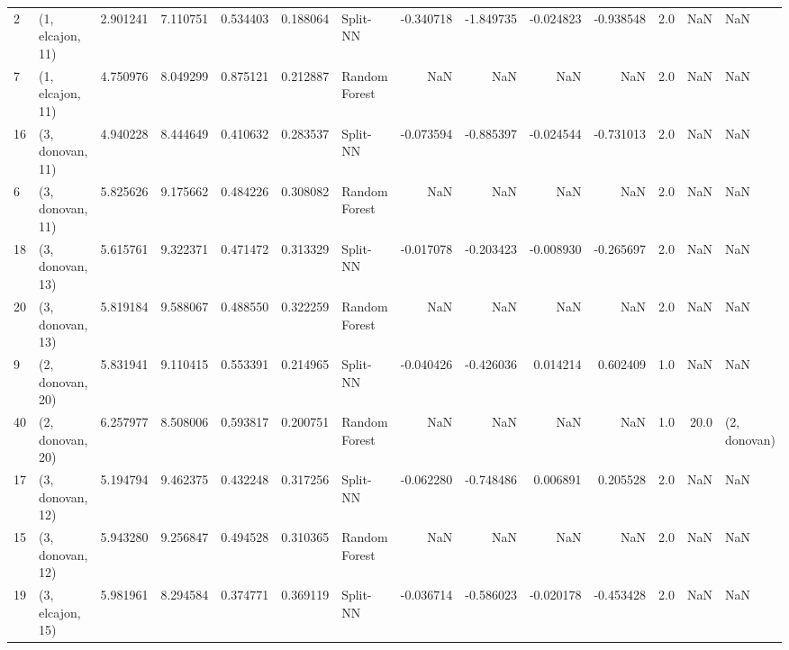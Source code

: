 \begin{tabular}{llrrrrlrrrrrrl}
2  &  (1, elcajon, 11) &   2.901241 &   7.110751 &   0.534403 &  0.188064 &       Split-NN &       -0.340718 &     -1.849735 &      -0.024823 &    -0.938548 &            2.0 &    NaN &              NaN \\
7  &  (1, elcajon, 11) &   4.750976 &   8.049299 &   0.875121 &  0.212887 &  Random Forest &             NaN &           NaN &            NaN &          NaN &            2.0 &    NaN &              NaN \\
16 &  (3, donovan, 11) &   4.940228 &   8.444649 &   0.410632 &  0.283537 &       Split-NN &       -0.073594 &     -0.885397 &      -0.024544 &    -0.731013 &            2.0 &    NaN &              NaN \\
6  &  (3, donovan, 11) &   5.825626 &   9.175662 &   0.484226 &  0.308082 &  Random Forest &             NaN &           NaN &            NaN &          NaN &            2.0 &    NaN &              NaN \\
18 &  (3, donovan, 13) &   5.615761 &   9.322371 &   0.471472 &  0.313329 &       Split-NN &       -0.017078 &     -0.203423 &      -0.008930 &    -0.265697 &            2.0 &    NaN &              NaN \\
20 &  (3, donovan, 13) &   5.819184 &   9.588067 &   0.488550 &  0.322259 &  Random Forest &             NaN &           NaN &            NaN &          NaN &            2.0 &    NaN &              NaN \\
9  &  (2, donovan, 20) &   5.831941 &   9.110415 &   0.553391 &  0.214965 &       Split-NN &       -0.040426 &     -0.426036 &       0.014214 &     0.602409 &            1.0 &    NaN &              NaN \\
40 &  (2, donovan, 20) &   6.257977 &   8.508006 &   0.593817 &  0.200751 &  Random Forest &             NaN &           NaN &            NaN &          NaN &            1.0 &   20.0 &     (2, donovan) \\
17 &  (3, donovan, 12) &   5.194794 &   9.462375 &   0.432248 &  0.317256 &       Split-NN &       -0.062280 &     -0.748486 &       0.006891 &     0.205528 &            2.0 &    NaN &              NaN \\
15 &  (3, donovan, 12) &   5.943280 &   9.256847 &   0.494528 &  0.310365 &  Random Forest &             NaN &           NaN &            NaN &          NaN &            2.0 &    NaN &              NaN \\
19 &  (3, elcajon, 15) &   5.981961 &   8.294584 &   0.374771 &  0.369119 &       Split-NN &       -0.036714 &     -0.586023 &      -0.020178 &    -0.453428 &            2.0 &    NaN &              NaN \\

\end{tabular}
